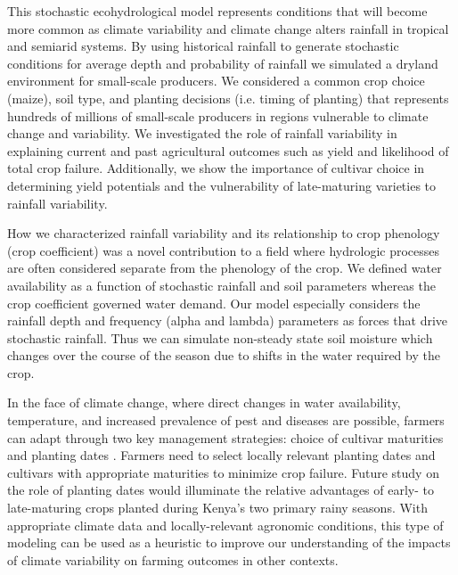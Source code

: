 This stochastic ecohydrological model represents conditions that will become more common as climate variability and climate change alters rainfall in tropical and semiarid systems. By using historical rainfall to generate stochastic conditions for average depth and probability of rainfall we simulated a dryland environment for small-scale producers. We considered a common crop choice (maize), soil type, and planting decisions (i.e. timing of planting) that represents hundreds of millions of small-scale producers in regions vulnerable to climate change and variability. We investigated the role of rainfall variability in explaining current and past agricultural outcomes such as yield and likelihood of total crop failure. Additionally, we show the importance of cultivar choice in determining yield potentials and the vulnerability of late-maturing varieties to rainfall variability. 

How we characterized rainfall variability and its relationship to crop phenology (crop coefficient) was a novel contribution to a field where hydrologic processes are often considered separate from the phenology of the crop. We defined water availability as a function of stochastic rainfall and soil parameters whereas the crop coefficient governed water demand. Our model especially considers the rainfall depth and frequency (alpha and lambda) parameters as forces that drive stochastic rainfall. Thus we can simulate non-steady state soil moisture which changes over the course of the season due to shifts in the water required by the crop.

In the face of climate change, where direct changes in water availability, temperature, and increased prevalence of pest and diseases are possible, farmers can adapt through two key management strategies: choice of cultivar maturities and planting dates \cite{van2013yield}. Farmers need to select locally relevant planting dates and cultivars with appropriate maturities to minimize crop failure. Future study on the role of planting dates would illuminate the relative advantages of early- to late-maturing crops planted during Kenya's two primary rainy seasons. With appropriate climate data and locally-relevant agronomic conditions, this type of modeling can be used as a heuristic to improve our understanding of the impacts of climate variability on farming outcomes in other contexts. 